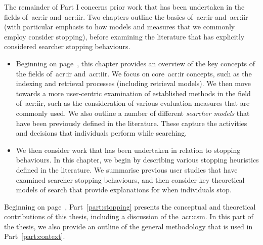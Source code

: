 \noindent
{}
The remainder of Part I concerns prior work that has been undertaken in the fields of~\gls{acr:ir} and~\gls{acr:iir}. Two chapters outline the basics of~\gls{acr:ir} and~\gls{acr:iir} (with particular emphasis to how models and measures that we commonly employ consider stopping), before examining the literature that has explicitly considered searcher stopping behaviours.

\begin{itemize}
    \item[]{} Beginning on page~\pageref{chap:ir_background}, this chapter provides an overview of the key concepts of the fields of~\gls{acr:ir} and~\gls{acr:iir}. We focus on core~\gls{acr:ir} concepts, such as the indexing and retrieval processes (including retrieval models). We then move towards a more user-centric examination of established methods in the field of~\gls{acr:iir}, such as the consideration of various evaluation measures that are commonly used. We also outline a number of different \emph{searcher models} that have been previously defined in the literature. These capture the activities and decisions that individuals perform while searching.
    
    \item[]{} We then consider work that has been undertaken in relation to stopping behaviours. In this chapter, we begin by describing various stopping heuristics defined in the literature. We summarise previous user studies that have examined searcher stopping behaviours, and then consider key theoretical models of search that provide explanations for when individuals stop.
\end{itemize}

\noindent
{} Beginning on page~\pageref{part:stopping}, Part~\ref{part:stopping} presents the conceptual and theoretical contributions of this thesis, including a discussion of the~\gls{acr:csm}. In this part of the thesis, we also provide an outline of the general methodology that is used in Part~\ref{part:context}.

